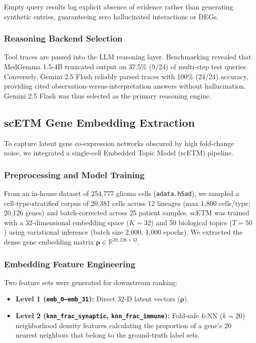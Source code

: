 \documentclass[conference]{IEEEtran}
\begin{document}
Empty query results log explicit absence of evidence rather than generating synthetic entries, guaranteeing zero hallucinated interactions or DEGs.

\subsubsection{Reasoning Backend Selection}
Tool traces are passed into the LLM reasoning layer. Benchmarking revealed that MedGemma 1.5-4B truncated output on 37.5\% (9/24) of multi-step test queries. Conversely, Gemini 2.5 Flash reliably parsed traces with 100\% (24/24) accuracy, providing cited observation-versus-interpretation answers without hallucination. Gemini 2.5 Flash was thus selected as the primary reasoning engine.

\subsection{scETM Gene Embedding Extraction}
To capture latent gene co-expression networks obscured by high fold-change noise, we integrated a single-cell Embedded Topic Model (scETM) pipeline.

\subsubsection{Preprocessing and Model Training}
From an in-house dataset of 254,777 glioma cells (\texttt{adata.h5ad}), we sampled a cell-type-stratified corpus of 20,381 cells across 12 lineages (max 1,800 cells/type; 20,126 genes) and batch-corrected across 25 patient samples. scETM was trained with a 32-dimensional embedding space ($K=32$) and 50 biological topics ($T=50$) using variational inference (batch size 2,000; 1,000 epochs). We extracted the dense gene embedding matrix $\boldsymbol{\rho} \in \mathbb{R}^{20,126 \times 32}$.

\subsubsection{Embedding Feature Engineering}
Two feature sets were generated for downstream ranking:
\begin{itemize}
    \item \textbf{Level 1 (\texttt{emb\_0--emb\_31}):} Direct 32-D latent vectors ($\boldsymbol{\rho}$).
    \item \textbf{Level 2 (\texttt{knn\_frac\_synaptic}, \texttt{knn\_frac\_immune}):} Fold-safe $k$-NN ($k=20$) neighborhood density features calculating the proportion of a gene's 20 nearest neighbors that belong to the ground-truth label sets.
\end{itemize}
\end{document}
